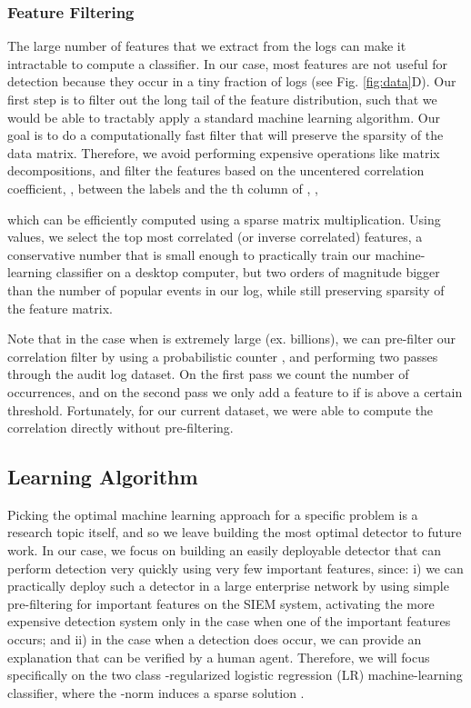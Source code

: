 \documentclass{sig-alternate-2013}
\begin{document}
\subsubsection{Feature Filtering}

The large number of features that we extract from the logs can make it intractable to compute a classifier. In our case, most features are not useful for detection because they occur in a tiny fraction of logs (see Fig. \ref{fig:data}D). Our first step is to filter out the long tail of the feature distribution, such that we would be able to tractably apply a standard machine learning algorithm. Our goal is to do a computationally fast filter that will preserve the sparsity of the data matrix. Therefore, we avoid performing expensive operations like matrix decompositions, and filter the features based on the uncentered correlation coefficient, , between the labels  and the th column of , ,

which can be efficiently computed using a sparse matrix multiplication. Using  values, we select the top  most correlated (or inverse correlated) features, a conservative number that is small enough to practically train our machine-learning classifier on a desktop computer, but two orders of magnitude bigger than the number of popular events in our log, while still preserving sparsity of the feature matrix.

Note that in the case when  is extremely large (ex. billions), we can pre-filter our correlation filter by using a probabilistic counter \cite{mitzenmacher2005probability}, and performing two passes through the audit log dataset. On the first pass we count the number of occurrences, and on the second pass we only add a feature to  if is above a certain threshold. Fortunately, for our current dataset, we were able to compute the correlation directly without pre-filtering.

\subsection{Learning Algorithm}

Picking the optimal machine learning approach for a specific problem is a research topic itself, and so we leave building the most optimal detector to future work. In our case, we focus on building an easily deployable detector that can perform detection very quickly using very few important features, since: i) we can practically deploy such a detector in a large enterprise network by using simple pre-filtering for important features on the SIEM system, activating the more expensive detection system only in the case when one of the important features occurs; and ii) in the case when a detection does occur, we can provide an explanation that can be verified by a human agent. Therefore, we will focus specifically on the two class -regularized logistic regression (LR) machine-learning classifier, where the -norm induces a sparse solution \cite{tibshirani1996regression}. 
\end{document}

